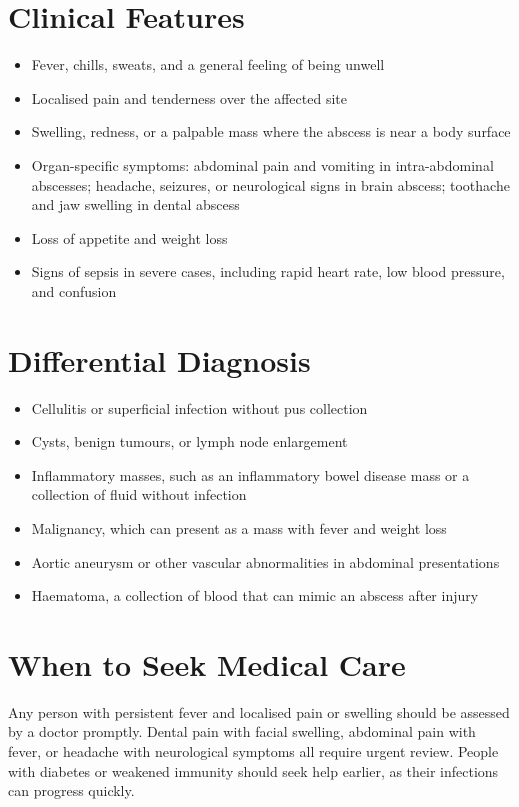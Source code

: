 \section*{Clinical Features}
\begin{itemize}
    \item Fever, chills, sweats, and a general feeling of being unwell
    \item Localised pain and tenderness over the affected site
    \item Swelling, redness, or a palpable mass where the abscess is near a body surface
    \item Organ-specific symptoms: abdominal pain and vomiting in intra-abdominal abscesses; headache, seizures, or neurological signs in brain abscess; toothache and jaw swelling in dental abscess
    \item Loss of appetite and weight loss
    \item Signs of sepsis in severe cases, including rapid heart rate, low blood pressure, and confusion
\end{itemize}

\section*{Differential Diagnosis}
\begin{itemize}
    \item Cellulitis or superficial infection without pus collection
    \item Cysts, benign tumours, or lymph node enlargement
    \item Inflammatory masses, such as an inflammatory bowel disease mass or a collection of fluid without infection
    \item Malignancy, which can present as a mass with fever and weight loss
    \item Aortic aneurysm or other vascular abnormalities in abdominal presentations
    \item Haematoma, a collection of blood that can mimic an abscess after injury
\end{itemize}

\section*{When to Seek Medical Care}
Any person with persistent fever and localised pain or swelling should be assessed by a doctor promptly. Dental pain with facial swelling, abdominal pain with fever, or headache with neurological symptoms all require urgent review. People with diabetes or weakened immunity should seek help earlier, as their infections can progress quickly.

